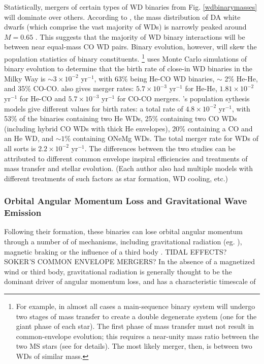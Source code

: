 Statistically, mergers of certain types of WD binaries from Fig. \ref{wdbinarymasses} will dominate over others.  According to \cite{tremblay}, the mass distribution of DA white dwarfs (which comprise the vast majority of WDs) is narrowly peaked around $M = 0.65$ \Msun.  This suggests that the majority of WD binary interactions will be between near equal-mass CO WD pairs.  Binary evolution, however, will skew the population statistics of binary constituents.  \footnote{For example, in almost all cases a main-sequence binary system will undergo two stages of mass transfer to create a double degenerate system (one for the giant phase of each star).  The first phase of mass transfer must not result in common-envelope evolution; this requires a near-unity mass ratio between the two MS stars (see \cite{vkercj10} for details).  The most likely merger, then, is between two WDs of similar mass.}  \cite{han98} uses Monte Carlo simulations of binary evolution to determine that the birth rate of close-in WD binaries in the Milky Way is $\sim 3 \times 10^{-2}$ yr$^{-1}$, with 63\% being He-CO WD binaries, $\sim$ 2\% He-He, and 35\% CO-CO.  \citeauthor{han98} also gives merger rates: $5.7 \times 10^{-3}$ yr$^{-1}$ for He-He, $1.81 \times 10^{-2}$ yr$^{-1}$ for He-CO and $5.7 \times 10^{-3}$ yr$^{-1}$ for CO-CO mergers.  \cite{nele+01a}'s population sythesis models give different values for birth rates: a total rate of $4.8 \times 10^{-2}$ yr$^{-1}$, with 53\% of the binaries containing two He WDs, 25\% containing two CO WDs (including hybrid CO WDs with thick He envelopes), 20\% containing a CO and an He WD, and $\sim 1$\% containing ONeMg WDs.  The total merger rate for WDs of all sorts is $2.2 \times 10^{-2}$ yr$^{-1}$.  The differences between the two studies can be attributed to different common envelope inspiral efficiencies and treatments of mass transfer and stellar evolution.  (Each author also had multiple models with different treatments of such factors as star formation, WD cooling, etc.)

\subsubsection{Orbital Angular Momentum Loss and Gravitational Wave Emission}

Following their formation, these binaries can lose orbital angular momentum through a number of of mechanisms, including gravitational radiation (eg. \citealt{XXX}), magnetic braking \citep{XXX} or the influence of a third body \citep{XXX}.  {\charles TIDAL EFFECTS?  SOKER'S COMMON ENVELOPE MERGERS?}  In the absence of a magnetized wind or third body, gravitational radiation is generally thought to be the dominant driver of angular momentum loss, and has a characteristic timescale of \citep{segrcm97}

